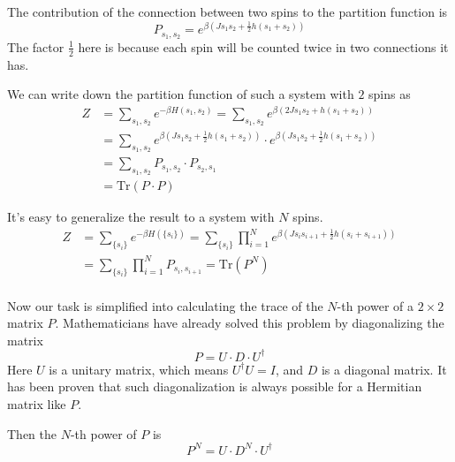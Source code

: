 \documentclass[11pt]{article}
\begin{document}
	The contribution of the connection between two spins to the partition function is
	\begin{equation} \label{eq:PartitionFunction1DGeneral2SpinsConnection}
		P_{s_1, s_2} = e^{\beta(J s_1 s_2 + \frac12h(s_1 + s_2))}
	\end{equation}
	The factor $\frac12$ here is because each spin will be counted twice in two connections it has.

	We can write down the partition function of such a system with $2$ spins as
	\begin{equation} \label{eq:PartitionFunction1DGeneral2SpinsConnectionSum}
		\begin{aligned}
		Z &= \sum_{s_1, s_2} e^{-\beta H(s_1, s_2)} = \sum_{s_1, s_2} e^{\beta(2J s_1 s_2 + h(s_1 + s_2))} \\
		&= \sum_{s_1, s_2} e^{\beta(J s_1 s_2 + \frac12h(s_1 + s_2))} \cdot e^{\beta(J s_1 s_2 + \frac12h(s_1 + s_2))} \\
		&= \sum_{s_1, s_2} P_{s_1, s_2} \cdot P_{s_2, s_1} \\
		&= \mathrm{Tr}(P \cdot P)
		\end{aligned}
	\end{equation}

	It's easy to generalize the result to a system with $N$ spins.
	\begin{equation} \label{eq:PartitionFunction1DGeneral}
		\begin{aligned}
			Z &= \sum_{\{s_i\}} e^{-\beta H(\{s_i\})} = \sum_{\{s_i\}} \prod_{i=1}^{N} e^{\beta(J s_i s_{i+1} + \frac12h(s_i + s_{i+1}))} \\
			&= \sum_{\{s_i\}} \prod_{i=1}^{N} P_{s_i, s_{i+1}} = \mathrm{Tr}(P^N) \\
		\end{aligned}
	\end{equation}

	Now our task is simplified into calculating the trace of the $N$-th power of a $2 \times 2$ matrix $P$.
	Mathematicians have already solved this problem by diagonalizing the matrix
	\begin{equation} \label{eq:MatrixPDiagonal}
		P = U \cdot D \cdot U^\dagger
	\end{equation}
	Here $U$ is a unitary matrix, which means $U^\dagger U = I$, and $D$ is a diagonal matrix.
	It has been proven that such diagonalization is always possible for a Hermitian matrix like $P$.

	Then the $N$-th power of $P$ is
	\begin{equation} \label{eq:MatrixPN}
		P^N = U \cdot D^N \cdot U^\dagger
	\end{equation}
\end{document}
